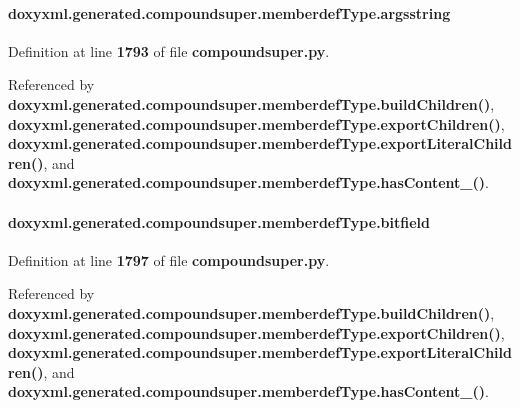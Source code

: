 \paragraph[{argsstring}]{\setlength{\rightskip}{0pt plus 5cm}doxyxml.\+generated.\+compoundsuper.\+memberdef\+Type.\+argsstring}\label{classdoxyxml_1_1generated_1_1compoundsuper_1_1memberdefType_a3c405e56024ea5d69d043d9625d0696c}


Definition at line {\bf 1793} of file {\bf compoundsuper.\+py}.



Referenced by {\bf doxyxml.\+generated.\+compoundsuper.\+memberdef\+Type.\+build\+Children()}, {\bf doxyxml.\+generated.\+compoundsuper.\+memberdef\+Type.\+export\+Children()}, {\bf doxyxml.\+generated.\+compoundsuper.\+memberdef\+Type.\+export\+Literal\+Children()}, and {\bf doxyxml.\+generated.\+compoundsuper.\+memberdef\+Type.\+has\+Content\+\_\+()}.

\paragraph[{bitfield}]{\setlength{\rightskip}{0pt plus 5cm}doxyxml.\+generated.\+compoundsuper.\+memberdef\+Type.\+bitfield}\label{classdoxyxml_1_1generated_1_1compoundsuper_1_1memberdefType_a4578adf5868736fd336a16c363c7d519}


Definition at line {\bf 1797} of file {\bf compoundsuper.\+py}.



Referenced by {\bf doxyxml.\+generated.\+compoundsuper.\+memberdef\+Type.\+build\+Children()}, {\bf doxyxml.\+generated.\+compoundsuper.\+memberdef\+Type.\+export\+Children()}, {\bf doxyxml.\+generated.\+compoundsuper.\+memberdef\+Type.\+export\+Literal\+Children()}, and {\bf doxyxml.\+generated.\+compoundsuper.\+memberdef\+Type.\+has\+Content\+\_\+()}.

